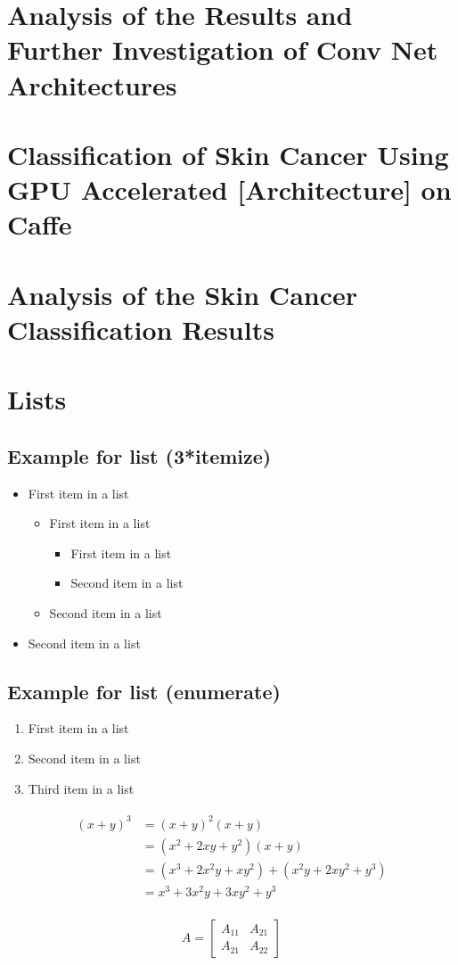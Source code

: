 \documentclass[paper=a4, fontsize=11pt]{scrartcl}
\numberwithin{equation}{section}		%
\numberwithin{figure}{section}			%
\numberwithin{table}{section}			%
\begin{document}
	\section{Analysis of the Results and Further Investigation of Conv Net Architectures}
	\section{Classification of Skin Cancer Using GPU Accelerated [Architecture] on Caffe}
	\section{Analysis of the Skin Cancer Classification Results}
	
	
	\section{Lists}
	
	\subsection{Example for list (3*itemize)}
	\begin{itemize}
		\item First item in a list 
		\begin{itemize}
			\item First item in a list 
			\begin{itemize}
				\item First item in a list 
				\item Second item in a list 
			\end{itemize}
			\item Second item in a list 
		\end{itemize}
		\item Second item in a list 
	\end{itemize}
	
	\subsection{Example for list (enumerate)}
	\begin{enumerate}
		\item First item in a list 
		\item Second item in a list 
		\item Third item in a list
	\end{enumerate}
	
	\begin{align} 
	\begin{split}
	(x+y)^3 	&= (x+y)^2(x+y)\\
	&=(x^2+2xy+y^2)(x+y)\\
	&=(x^3+2x^2y+xy^2) + (x^2y+2xy^2+y^3)\\
	&=x^3+3x^2y+3xy^2+y^3
	\end{split}					
	\end{align}
	
	\begin{align}
	A = 
	\begin{bmatrix}
	A_{11} & A_{21} \\
	A_{21} & A_{22}
	\end{bmatrix}
	\end{align}
	



\end{document}
